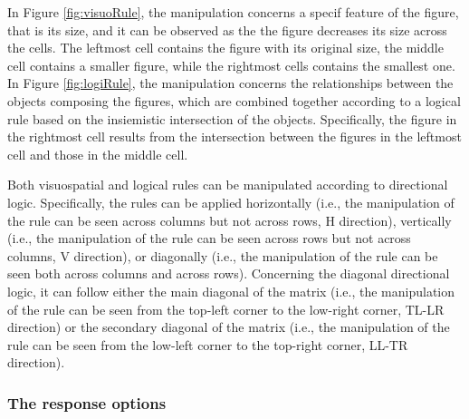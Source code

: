 In Figure \ref{fig:visuoRule}, the manipulation concerns a specif feature of the figure, that is its size, and it can be observed as the the figure decreases its size across the cells.
The leftmost cell contains the figure with its original size, the middle cell contains a smaller figure, while the rightmost cells contains the smallest one.
In Figure \ref{fig:logiRule}, the manipulation concerns the relationships between the objects composing the figures, which are combined together according to a logical rule based on the insiemistic intersection of the objects.
Specifically, the figure in the rightmost cell results from the intersection between the figures in the leftmost cell and those in the middle cell.

Both visuospatial and logical rules can be manipulated according to directional logic.
Specifically, the rules can be applied horizontally (i.e., the manipulation of the rule can be seen across columns but not across rows, H direction), vertically (i.e., the manipulation of the rule can be seen across rows but not across columns, V direction), or diagonally (i.e., the manipulation of the rule can be seen both across columns and across rows).
Concerning the diagonal directional logic, it can follow either the main diagonal of the matrix (i.e., the manipulation of the rule can be seen from the top-left corner to the low-right corner, TL-LR direction) or the secondary diagonal of the matrix (i.e., the manipulation of the rule can be seen from the low-left corner to the top-right corner, LL-TR direction).

\subsubsection{The response options}\label{the-response-options}

